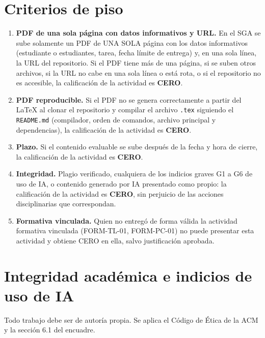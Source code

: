 \documentclass[11pt]{article}
\newcommand{\seccion}[1]{\section{\textcolor{utegreendk}{#1}}}
\begin{document}
\seccion{Criterios de piso}

\begin{cajapiso}[title={Criterios de piso: su incumplimiento implica calificación CERO en la actividad}]
	\begin{enumerate}[label=\textbf{P\arabic*.},leftmargin=24pt,itemsep=3pt]
		\item \textbf{PDF de una sola página con datos informativos y URL.} En el SGA se sube solamente un PDF de UNA SOLA página con los datos informativos (estudiante o estudiantes, tarea, fecha límite de entrega) y, en una sola línea, la URL del repositorio. Si el PDF tiene más de una página, si se suben otros archivos, si la URL no cabe en una sola línea o está rota, o si el repositorio no es accesible, la calificación de la actividad es \textbf{CERO}.
		\item \textbf{PDF reproducible.} Si el PDF no se genera correctamente a partir del \LaTeX{} al clonar el repositorio y compilar el archivo \texttt{.tex} siguiendo el \texttt{README.md} (compilador, orden de comandos, archivo principal y dependencias), la calificación de la actividad es \textbf{CERO}.
		\item \textbf{Plazo.} Si el contenido evaluable se sube después de la fecha y hora de cierre, la calificación de la actividad es \textbf{CERO}.
		\item \textbf{Integridad.} Plagio verificado, cualquiera de los indicios graves G1 a G6 de uso de IA, o contenido generado por IA presentado como propio: la calificación de la actividad es \textbf{CERO}, sin perjuicio de las acciones disciplinarias que correspondan.
		\item \textbf{Formativa vinculada.} Quien no entregó de forma válida la actividad formativa vinculada (FORM-TL-01, FORM-PC-01) no puede presentar esta actividad y obtiene CERO en ella, salvo justificación aprobada.
	\end{enumerate}
\end{cajapiso}

\seccion{Integridad académica e indicios de uso de IA}

Todo trabajo debe ser de autoría propia. Se aplica el Código de Ética de la ACM \citep{acm_code_2018} y la sección 6.1 del encuadre.
\end{document}
